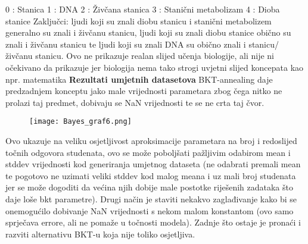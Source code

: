 		0 : Stanica
		1 : DNA
		2 : Živčana stanica
		3 : Stanični metabolizam
		4 : Dioba stanice\newline
		\newline Zaključci: ljudi koji su znali diobu stanicu i stanični metabolizem generalno su znali i živčanu stanicu, ljudi koji su znali diobu stanice obično su znali i živčanu stanicu te ljudi koji su znali DNA su obično znali i stanicu/živčanu stanicu. Ovo ne prikazuje realan slijed učenja biologije, ali nije ni očekivano da prikazuje jer biologija nema tako strogi uvjetni slijed koncepata kao npr. matematika\newline
		\newline \textbf{Rezultati umjetnih datasetova}	\newline
		BKT-annealing daje predzadnjem konceptu jako male vrijednosti parametara zbog čega nitko ne prolazi taj predmet, dobivaju se NaN vrijednosti te se ne crta taj čvor.
		\begin{figure}[!htb]
			\centering
			\texttt{[image: Bayes\_graf6.png]}
			\caption{}
			\label{}
		\end{figure}
		Ovo ukazuje na veliku osjetljivost aproksimacije parametara na broj i redoslijed točnih odgovora studenata, ovo se može poboljšati pažljivim odabirom mean i stddev vrijednosti kod generiranja umjetnog dataseta (ne odabrati premali mean te pogotovo ne uzimati veliki stddev kod malog meana i uz mali broj studenata jer se može dogoditi da većina njih dobije male postotke riješenih zadataka što daje loše bkt parametre). Drugi način je staviti nekakvo zaglađivanje kako bi se onemogućilo dobivanje NaN vrijednosti s nekom malom konstantom (ovo samo sprječava errore, ali ne pomaže u točnosti modela). Zadnje što ostaje je pronaći i razviti alternativu BKT-u koja nije toliko osjetljiva.
